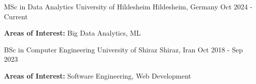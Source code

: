 

\begin{cventries}

  \cventry
    {MSc in Data Analytics} %
    {University of Hildesheim} %
    {Hildesheim, Germany} %
    {Oct 2024 - Current} %
    {
      \begin{cvitems} %
       \item {\textbf{Areas of Interest:}  Big Data Analytics, ML}
      \end{cvitems}
    }
    
  \cventry
    {BSc in Computer Engineering} %
    {University of Shiraz} %
    {Shiraz, Iran} %
    {Oct 2018 - Sep 2023} %
    {
      \begin{cvitems} %
        \item {\textbf{Areas of Interest:}  Software Engineering, Web Development}
      \end{cvitems}
    }
\end{cventries}
